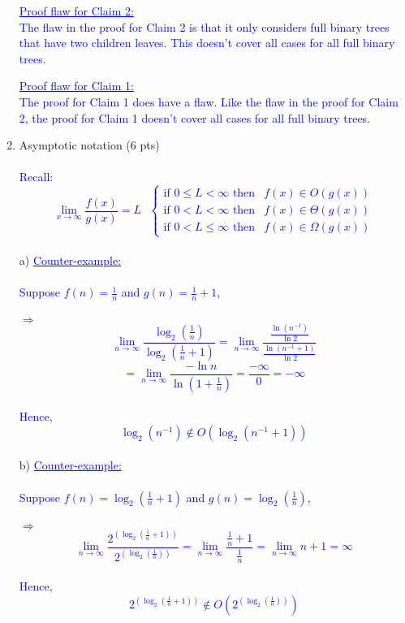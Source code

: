 \documentclass[11pt]{article}
\begin{document}
\begin{enumerate}
\textcolor{blue}{\underline{Proof flaw for Claim 2:}\\
The flaw in the proof for Claim 2 is that it only considers full binary trees that have two children leaves. This doesn't cover all cases for all full binary trees.}

\textcolor{blue}{\underline{Proof flaw for Claim 1:}\\
The proof for Claim 1 does have a flaw. Like the flaw in the proof for Claim 2, the proof for Claim 1 doesn't cover all cases for all full binary trees. 
}

\item Asymptotic notation (6 pts)\\
\- \\
\textcolor{blue}{Recall: \[ \lim_{x\to\infty} \frac{f(x)}{g(x)} = L \text{  }\begin{cases} \text{if } 0 \leq L < \infty \text{ then}&f(x) \in O(g(x))\\ \text{if } 0<L<\infty \text{ then}&f(x) \in \Theta(g(x))\\ \text{if } 0<L\leq \infty \text{ then}&f(x) \in \Omega(g(x))\end{cases}\]\\}
a) \textcolor{blue}{\underline{Counter-example:}\\
\- \\
\phantom{b) } Suppose ${f(n) = \frac{1}{n}}$ and ${g(n) = \frac{1}{n} + 1}$,\\
\- \\
\phantom{b) } ${\Rightarrow}$ $$\lim_{n\to\infty} \frac{\log_2{(\frac{1}{n})}}{\log_2{(\frac{1}{n} + 1)}} = \lim_{n\to\infty} \frac{\frac{\ln (n^{-1})}{\ln 2}}{\frac{\ln (n^{-1} + 1)}{\ln 2}}$$  $$= \lim_{n\to\infty} \frac{-\ln n}{\ln (1+\frac{1}{n})} = \frac{-\infty}{0} = -\infty$$\\
\phantom{b) } Hence, $$\log_2{(n^{-1})} \not\in O(\log_2{(n^{-1} + 1)})$$\\
}
b) \textcolor{blue}{\underline{Counter-example:}\\
\- \\
\phantom{b) } Suppose ${f(n) = \log_2{(\frac{1}{n}+1)}}$ and ${g(n) =\log_2{(\frac{1}{n})}}$,\\
\- \\
\phantom{b) } ${\Rightarrow}$ $$\lim_{n\to\infty} \frac{2^{(\log_2{(\frac{1}{n}+1)})}}{2^{(\log_2{(\frac{1}{n})})}} =\lim_{n\to\infty}  \frac{\frac{1}{n}+1}{\frac{1}{n}} = \lim_{n\to\infty} n+1 = \infty$$\\
\phantom{b) } Hence, $$2^{(\log_2{(\frac{1}{n}+1)})} \not\in O(2^{(\log_2{(\frac{1}{n})})})$$\\
}
\end{enumerate}
\end{document}

